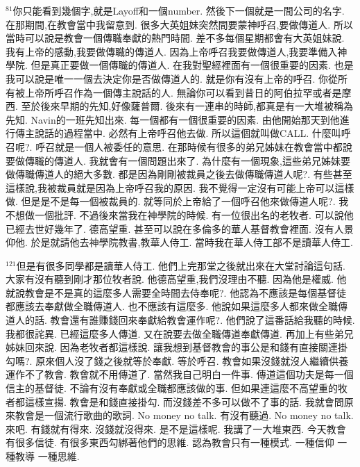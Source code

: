 \documentclass{book}
\begin{document}
$^{81}$你只能看到幾個字,就是Layoff和一個number.
然後下一個就是一間公司的名字.
在那期間,在教會當中我留意到.
很多大英姐妹突然間要蒙神呼召,要做傳道人.
所以當時可以說是教會一個傳職奉獻的熱門時間.
差不多每個星期都會有大英姐妹說.
我有上帝的感動,我要做傳職的傳道人.
因為上帝呼召我要做傳道人,我要準備入神學院.
但是真正要做一個傳職的傳道人.
在我對聖經裡面有一個很重要的因素.
也是我可以說是唯一一個去決定你是否做傳道人的.
就是你有沒有上帝的呼召.
你從所有被上帝所呼召作為一個傳主說話的人.
無論你可以看到昔日的阿伯拉罕或者是摩西.
至於後來早期的先知,好像薩普爾.
後來有一連串的時師,都真是有一大堆被稱為先知.
Navin的一班先知出來.
每一個都有一個很重要的因素.
由他開始那天到他進行傳主說話的過程當中.
必然有上帝呼召他去做.
所以這個就叫做CALL.
什麼叫呼召呢?.
呼召就是一個人被委任的意思.
在那時候有很多的弟兄姊妹在教會當中都說要做傳職的傳道人.
我就會有一個問題出來了.
為什麼有一個現象,這些弟兄姊妹要做傳職傳道人的絕大多數.
都是因為剛剛被裁員之後去做傳職傳道人呢?.
有些甚至這樣說,我被裁員就是因為上帝呼召我的原因.
我不覺得一定沒有可能上帝可以這樣做.
但是是不是每一個被裁員的.
就等同於上帝給了一個呼召他來做傳道人呢?.
我不想做一個批評.
不過後來當我在神學院的時候.
有一位很出名的老牧者.
可以說他已經去世好幾年了.
德高望重.
甚至可以說在多倫多的華人基督教會裡面.
沒有人景仰他.
於是就請他去神學院教書,教華人侍工.
當時我在華人侍工部不是讀華人侍工.

$^{121}$但是有很多同學都是讀華人侍工.
他們上完那堂之後就出來在大堂討論這句話.
大家有沒有聽到剛才那位牧者說.
他德高望重,我們沒理由不聽.
因為他是權威.
他就說教會是不是真的這麼多人需要全時間去侍奉呢?.
他認為不應該是每個基督徒都應該去奉獻做全職傳道人.
也不應該有這麼多.
他說如果這麼多人都來做全職傳道人的話.
教會還有誰賺錢回來奉獻給教會運作呢?.
他們說了這番話給我聽的時候.
我都很詫異.
已經這麼多人傳道.
又在說要去做全職傳道奉獻傳道.
再加上有些弟兄姊妹回來說.
因為老牧者都這樣說.
讓我想到基督教會的事公是和錢有直接關連掛勾嗎?.
原來個人沒了錢之後就等於奉獻.
等於呼召.
教會如果沒錢就沒人繼續供養運作不了教會.
教會就不用傳道了.
當然我自己明白一件事.
傳道這個功夫是每一個信主的基督徒.
不論有沒有奉獻或全職都應該做的事.
但如果連這麼不高望重的牧者都這樣宣揚.
教會是和錢直接掛勾.
而沒錢差不多可以做不了事的話.
我就會問原來教會是一個流行歌曲的歌詞.
No money no talk.
有沒有聽過.
No money no talk.
來吧.
有錢就有得來.
沒錢就沒得來.
是不是這樣呢.
我講了一大堆東西.
今天教會有很多信徒.
有很多東西勾綁著他們的思維.
認為教會只有一種模式.
一種信仰 一種教導 一種思維.
\end{document}
